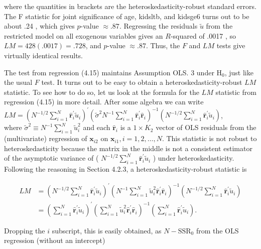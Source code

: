 \documentclass[10pt]{article}
\begin{document}
where the quantities in brackets are the heteroskedasticity-robust standard errors. The F statistic for joint significance of age, kidsltb, and kidsge6 turns out to be about .24 , which gives $p$-value $\approx .87$. Regressing the residuals $\tilde{u}$ from the restricted model on all exogenous variables gives an $R$-squared of .0017 , so $L M=428(.0017)=.728$, and $p$-value $\approx .87$. Thus, the $F$ and $L M$ tests give virtually identical results.

The test from regression (4.15) maintains Assumption OLS. 3 under $\mathrm{H}_{0}$, just like the usual $F$ test. It turns out to be easy to obtain a heteroskedasticity-robust $L M$ statistic. To see how to do so, let us look at the formula for the $L M$ statistic from regression (4.15) in more detail. After some algebra we can write\\
$L M=\left(N^{-1 / 2} \sum_{i=1}^{N} \hat{\mathbf{r}}_{i}^{\prime} \tilde{u}_{i}\right)^{\prime}\left(\tilde{\sigma}^{2} N^{-1} \sum_{i=1}^{N} \hat{\mathbf{r}}_{i}^{\prime} \hat{\mathbf{r}}_{i}\right)^{-1}\left(N^{-1 / 2} \sum_{i=1}^{N} \hat{\mathbf{r}}_{i}^{\prime} \tilde{u}_{i}\right)$,\\
where $\tilde{\sigma}^{2} \equiv N^{-1} \sum_{i=1}^{N} \tilde{u}_{i}^{2}$ and each $\hat{\mathbf{r}}_{i}$ is a $1 \times K_{2}$ vector of OLS residuals from the (multivariate) regression of $\mathbf{x}_{i 2}$ on $\mathbf{x}_{i 1}, i=1,2, \ldots, N$. This statistic is not robust to heteroskedasticity because the matrix in the middle is not a consistent estimator of the asymptotic variance of ( $N^{-1 / 2} \sum_{i=1}^{N} \hat{\mathbf{r}}_{i}^{\prime} \tilde{u}_{i}$ ) under heteroskedasticity. Following the reasoning in Section 4.2.3, a heteroskedasticity-robust statistic is

$$
\begin{aligned}
L M & =\left(N^{-1 / 2} \sum_{i=1}^{N} \hat{\mathbf{r}}_{i}^{\prime} \tilde{u}_{i}\right)^{\prime}\left(N^{-1} \sum_{i=1}^{N} \tilde{u}_{i}^{2} \hat{\mathbf{r}}_{i}^{\prime} \hat{\mathbf{r}}_{i}\right)^{-1}\left(N^{-1 / 2} \sum_{i=1}^{N} \hat{\mathbf{r}}_{i}^{\prime} \tilde{u}_{i}\right) \\
& =\left(\sum_{i=1}^{N} \hat{\mathbf{r}}_{i}^{\prime} \tilde{u}_{i}\right)^{\prime}\left(\sum_{i=1}^{N} \tilde{u}_{i}^{2} \hat{\mathbf{r}}_{i}^{\prime} \hat{\mathbf{r}}_{i}\right)^{-1}\left(\sum_{i=1}^{N} \hat{\mathbf{r}}_{i}^{\prime} \tilde{u}_{i}\right) .
\end{aligned}
$$

Dropping the $i$ subscript, this is easily obtained, as $N-\mathrm{SSR}_{0}$ from the OLS regression (without an intercept)
\end{document}
